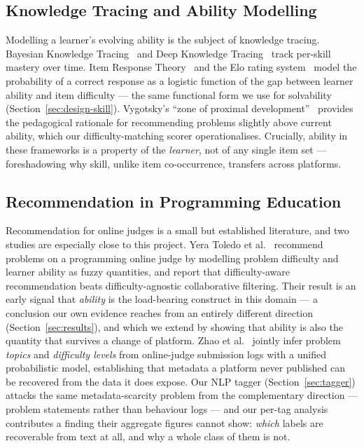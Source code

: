 \documentclass[12pt,a4paper]{article}
\begin{document}
\subsection{Knowledge Tracing and Ability Modelling}
Modelling a learner's evolving ability is the subject of knowledge tracing. Bayesian
Knowledge Tracing~\cite{corbett1994} and Deep Knowledge Tracing~\cite{piech2015} track
per-skill mastery over time. Item Response Theory~\cite{pelanek2017} and the Elo rating
system~\cite{elo1978} model the probability of a correct response as a logistic function
of the gap between learner ability and item difficulty --- the same functional form we
use for solvability (Section~\ref{sec:design-skill}). Vygotsky's ``zone of proximal
development''~\cite{vygotsky1978} provides the pedagogical rationale for recommending
problems slightly above current ability, which our difficulty-matching scorer
operationalises. Crucially, ability in these frameworks is a property of the
\emph{learner}, not of any single item set --- foreshadowing why skill, unlike
item co-occurrence, transfers across platforms.

\subsection{Recommendation in Programming Education}
Recommendation for online judges is a small but established literature, and two studies
are especially close to this project. Yera Toledo et al.~\cite{yera2018} recommend
problems on a programming online judge by modelling problem difficulty and learner
ability as fuzzy quantities, and report that difficulty-aware recommendation beats
difficulty-agnostic collaborative filtering. Their result is an early signal that
\emph{ability} is the load-bearing construct in this domain --- a conclusion our own
evidence reaches from an entirely different direction (Section~\ref{sec:results}), and
which we extend by showing that ability is also the quantity that survives a change of
platform. Zhao et al.~\cite{zhao2018} jointly infer problem \emph{topics} and
\emph{difficulty levels} from online-judge submission logs with a unified probabilistic
model, establishing that metadata a platform never published can be recovered from the
data it does expose. Our NLP tagger (Section~\ref{sec:tagger}) attacks the same
metadata-scarcity problem from the complementary direction --- problem statements rather
than behaviour logs --- and our per-tag analysis contributes a finding their aggregate
figures cannot show: \emph{which} labels are recoverable from text at all, and why a
whole class of them is not.
\end{document}
